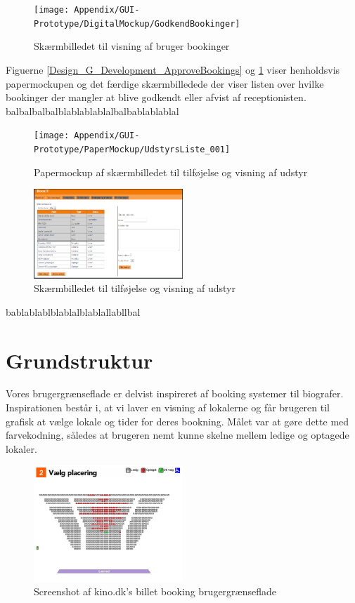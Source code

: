 \begin{figure}[h!]
  \centering
    \texttt{[image: Appendix/GUI-Prototype/DigitalMockup/GodkendBookinger]}
  \caption{Skærmbilledet til visning af bruger bookinger}
\label{Design_G_Development_ApproveBookings_Final}
\end{figure}

Figuerne \ref{Design_G_Development_ApproveBookings} og \ref{Design_G_Development_ApproveBookings_Final} viser henholdsvis papermockupen og det færdige skærmbilledede der viser listen over hvilke bookinger der mangler at blive godkendt eller afvist af receptionisten.
balbalbalbalblablablablalbalbablablablal

\begin{figure}[h!]
  \centering
    \texttt{[image: Appendix/GUI-Prototype/PaperMockup/UdstyrsListe\_001]}
  \caption{Papermockup af skærmbilledet til tilføjelse og visning af udstyr}
\label{Design_G_Development_EquipmentListl}
\end{figure}

\begin{figure}[h!]
  \centering
    \includegraphics[width=0.5\textwidth]{Appendix/GUI-Prototype/DigitalMockup/UdstyrsListe}
  \caption{Skærmbilledet til tilføjelse og visning af udstyr}
\label{Design_G_Development_EquipmentList_Final}
\end{figure}

bablablablblablalblablallabllbal

\section{Grundstruktur}
\label{Design_G_Structure}
Vores brugergrænseflade er delvist inspireret af booking systemer til biografer. Inspirationen består i, at vi laver en visning af lokalerne og får brugeren til grafisk at vælge lokale og tider for deres bookning. Målet var at gøre dette med farvekodning, således at brugeren nemt kunne skelne mellem ledige og optagede lokaler.

\begin{figure}[h!]
  \centering
    \includegraphics[width=0.5\textwidth]{Appendix/GUI-Prototype/KinoBooking}
  \caption{Screenshot af kino.dk's billet booking brugergrænseflade}
\label{Design_G_Structure_kino}
\end{figure}

